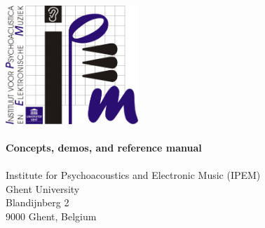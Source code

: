 \begin{titlepage}
    \begin{center}
        \includegraphics[width=5cm]{Graphics/IpemLogo}
        \\[3cm]
        \textbf{\Huge \IPEMFullTitle}
        \\[0.8cm]
        \textbf{\LARGE Concepts, demos, and reference manual}
        \\[1.5cm]

        \IPEMAuthors\\
        Institute for Psychoacoustics and Electronic Music (IPEM)\\
        Ghent University\\
        Blandijnberg 2\\
        9000 Ghent, Belgium\\
        \IPEMMailSupport\\
        \IPEMWebSite{}\\[1.5cm]

        \IPEMVersion\\
        \IPEMDate
        \\[1.5cm]

    \end{center}
\end{titlepage}
